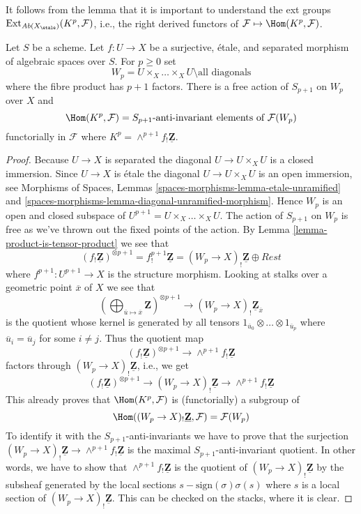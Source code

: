 \noindent
It follows from the lemma that it is important to understand the
ext groups $\text{Ext}_{\textit{Ab}(X_\etale)}(K^p, \mathcal{F})$,
i.e., the right derived functors of
$\mathcal{F} \mapsto \Hom(K^p, \mathcal{F})$.

\begin{lemma}
\label{lemma-compute}
Let $S$ be a scheme. Let $f : U \to X$ be a surjective, \'etale, and separated
morphism of algebraic spaces over $S$. For $p \geq 0$ set
$$
W_p = U \times_X \ldots \times_X U \setminus \text{all diagonals}
$$
where the fibre product has $p + 1$ factors.
There is a free action of $S_{p + 1}$ on $W_p$ over $X$ and
$$
\Hom(K^p, \mathcal{F}) = S_{p + 1}\text{-anti-invariant elements of }
\mathcal{F}(W_p)
$$
functorially in $\mathcal{F}$ where
$K^p = \wedge^{p + 1}f_!\underline{\mathbf{Z}}$.
\end{lemma}

\begin{proof}
Because $U \to X$ is separated the diagonal $U \to U \times_X U$ is a
closed immersion. Since $U \to X$ is \'etale the diagonal
$U \to U \times_X U$ is an open immersion, see
Morphisms of Spaces, Lemmas
\ref{spaces-morphisms-lemma-etale-unramified} and
\ref{spaces-morphisms-lemma-diagonal-unramified-morphism}.
Hence $W_p$ is an open and closed subspace of
$U^{p + 1} = U \times_X \ldots \times_X U$. The action of $S_{p + 1}$
on $W_p$ is free as we've thrown out the fixed points of the action.
By
Lemma \ref{lemma-product-is-tensor-product}
we see that
$$
(f_!\underline{\mathbf{Z}})^{\otimes p + 1} =
f^{p + 1}_!\underline{\mathbf{Z}} = (W_p \to X)_!\underline{\mathbf{Z}}
\oplus Rest
$$
where $f^{p + 1} : U^{p + 1} \to X$ is the structure morphism.
Looking at stalks over a geometric point $\overline{x}$ of $X$
we see that
$$
\left(
\bigoplus\nolimits_{\overline{u} \mapsto \overline{x}} \mathbf{Z}
\right)^{\otimes p + 1}
\longrightarrow
(W_p \to X)_!\underline{\mathbf{Z}}_{\overline{x}}
$$
is the quotient whose kernel is generated by all tensors
$1_{\overline{u}_0} \otimes \ldots \otimes 1_{\overline{u}_p}$
where $\overline{u}_i = \overline{u}_j$ for some $i \not = j$.
Thus the quotient map
$$
(f_!\underline{\mathbf{Z}})^{\otimes p + 1}
\longrightarrow
\wedge^{p + 1}f_!\underline{\mathbf{Z}}
$$
factors through $(W_p \to X)_!\underline{\mathbf{Z}}$, i.e., we get
$$
(f_!\underline{\mathbf{Z}})^{\otimes p + 1}
\longrightarrow
(W_p \to X)_!\underline{\mathbf{Z}}
\longrightarrow
\wedge^{p + 1}f_!\underline{\mathbf{Z}}
$$
This already proves that $\Hom(K^p, \mathcal{F})$ is (functorially) a
subgroup of
$$
\Hom((W_p \to X)_!\underline{\mathbf{Z}}, \mathcal{F}) = \mathcal{F}(W_p)
$$
To identify it with the $S_{p + 1}$-anti-invariants we have to prove that
the surjection $(W_p \to X)_!\underline{\mathbf{Z}}
\to \wedge^{p + 1}f_!\underline{\mathbf{Z}}$ is the maximal
$S_{p + 1}$-anti-invariant quotient. In other words, we have to show that
$\wedge^{p + 1}f_!\underline{\mathbf{Z}}$ is the quotient of
$(W_p \to X)_!\underline{\mathbf{Z}}$ by the subsheaf generated by
the local sections $s - \text{sign}(\sigma)\sigma(s)$ where $s$ is
a local section of $(W_p \to X)_!\underline{\mathbf{Z}}$.
This can be checked on the stacks, where it is clear.
\end{proof}


